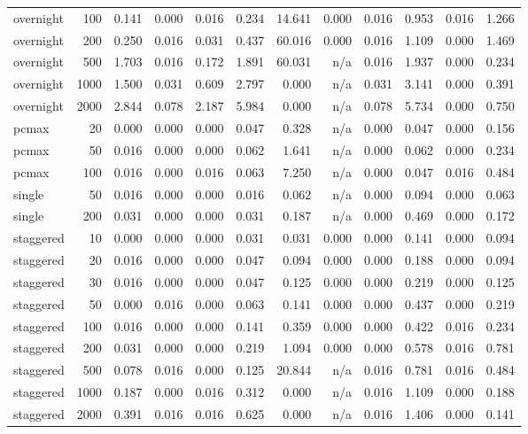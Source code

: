 \begin{table}[htbp]
\begin{tabular}{lrrrrrrrrrrr}
overnight & 100 & 0.141 & 0.000 & 0.016 & 0.234 & 14.641 & 0.000 & 0.016 & 0.953 & 0.016 & 1.266 \\
overnight & 200 & 0.250 & 0.016 & 0.031 & 0.437 & 60.016 & 0.000 & 0.016 & 1.109 & 0.000 & 1.469 \\
overnight & 500 & 1.703 & 0.016 & 0.172 & 1.891 & 60.031 & n/a & 0.016 & 1.937 & 0.000 & 0.234 \\
overnight & 1000 & 1.500 & 0.031 & 0.609 & 2.797 & 0.000 & n/a & 0.031 & 3.141 & 0.000 & 0.391 \\
overnight & 2000 & 2.844 & 0.078 & 2.187 & 5.984 & 0.000 & n/a & 0.078 & 5.734 & 0.000 & 0.750 \\
pcmax & 20 & 0.000 & 0.000 & 0.000 & 0.047 & 0.328 & n/a & 0.000 & 0.047 & 0.000 & 0.156 \\
pcmax & 50 & 0.016 & 0.000 & 0.000 & 0.062 & 1.641 & n/a & 0.000 & 0.062 & 0.000 & 0.234 \\
pcmax & 100 & 0.016 & 0.000 & 0.016 & 0.063 & 7.250 & n/a & 0.000 & 0.047 & 0.016 & 0.484 \\
single & 50 & 0.016 & 0.000 & 0.000 & 0.016 & 0.062 & n/a & 0.000 & 0.094 & 0.000 & 0.063 \\
single & 200 & 0.031 & 0.000 & 0.000 & 0.031 & 0.187 & n/a & 0.000 & 0.469 & 0.000 & 0.172 \\
staggered & 10 & 0.000 & 0.000 & 0.000 & 0.031 & 0.031 & 0.000 & 0.000 & 0.141 & 0.000 & 0.094 \\
staggered & 20 & 0.016 & 0.000 & 0.000 & 0.047 & 0.094 & 0.000 & 0.000 & 0.188 & 0.000 & 0.094 \\
staggered & 30 & 0.016 & 0.000 & 0.000 & 0.047 & 0.125 & 0.000 & 0.000 & 0.219 & 0.000 & 0.125 \\
staggered & 50 & 0.000 & 0.016 & 0.000 & 0.063 & 0.141 & 0.000 & 0.000 & 0.437 & 0.000 & 0.219 \\
staggered & 100 & 0.016 & 0.000 & 0.000 & 0.141 & 0.359 & 0.000 & 0.000 & 0.422 & 0.016 & 0.234 \\
staggered & 200 & 0.031 & 0.000 & 0.000 & 0.219 & 1.094 & 0.000 & 0.000 & 0.578 & 0.016 & 0.781 \\
staggered & 500 & 0.078 & 0.016 & 0.000 & 0.125 & 20.844 & n/a & 0.016 & 0.781 & 0.016 & 0.484 \\
staggered & 1000 & 0.187 & 0.000 & 0.016 & 0.312 & 0.000 & n/a & 0.016 & 1.109 & 0.000 & 0.188 \\
staggered & 2000 & 0.391 & 0.016 & 0.016 & 0.625 & 0.000 & n/a & 0.016 & 1.406 & 0.000 & 0.141 \\
\bottomrule
\end{tabular}
\end{table}
